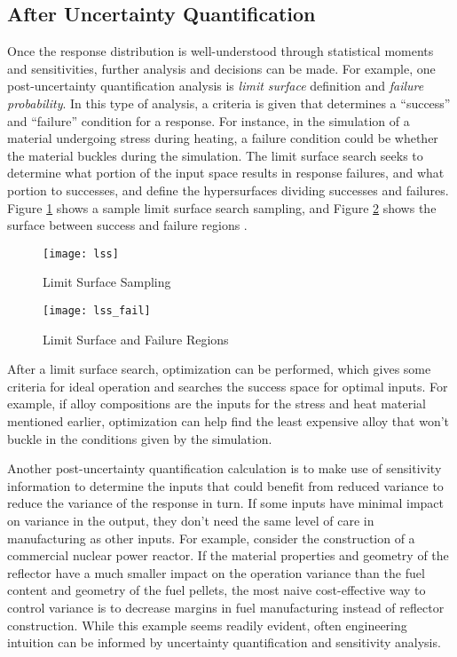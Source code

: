 \subsection{After Uncertainty Quantification}
Once the response distribution is well-understood through statistical moments and sensitivities, 
further analysis
and decisions can be made.  For example, one post-uncertainty quantification analysis is \emph{limit
surface} definition and \emph{failure probability}.  In this type of analysis, a criteria is given that determines
a ``success'' and ``failure'' condition for a response.  For instance, in the simulation of a
material undergoing stress during heating, a failure condition could be whether the material
buckles during the simulation.  The limit surface search seeks to determine what portion of the
input space results in response failures, and what portion to successes, and define the hypersurfaces dividing
successes and failures.  Figure \ref{fig:lss} shows a sample limit surface search sampling, and Figure
\ref{fig:lss fail} shows the surface between success and failure regions \cite{raven}.  

\begin{figure}[htb]
  \centering
  \texttt{[image: lss]}
  \caption{Limit Surface Sampling \cite{raven}}
  \label{fig:lss}
\end{figure}
\begin{figure}[htb]
  \centering
  \texttt{[image: lss\_fail]}
  \caption{Limit Surface and Failure Regions \cite{raven}}
  \label{fig:lss fail}
\end{figure}

After a limit surface search, optimization can be performed, which gives
some criteria for ideal operation and searches the success space for optimal inputs.  For example,
if alloy compositions are the inputs for the stress and heat material mentioned earlier, optimization
can help find the least expensive alloy that won't buckle in the conditions given by the simulation.

Another post-uncertainty quantification calculation is to make use of sensitivity information to determine
the inputs that could benefit from reduced variance to reduce the variance of the response in turn.
If some inputs have minimal impact on variance in the output, they don't need the same level of care
in manufacturing as other inputs.  For example, consider the construction of a commercial nuclear power
reactor.  If the material properties and geometry of the reflector have a much smaller impact on the operation
variance than the fuel content and geometry of the fuel pellets, the most naive cost-effective way to control
variance is to decrease margins in fuel manufacturing instead of reflector construction.  While this example
seems readily evident, often engineering intuition can be informed by uncertainty quantification and
sensitivity analysis.

